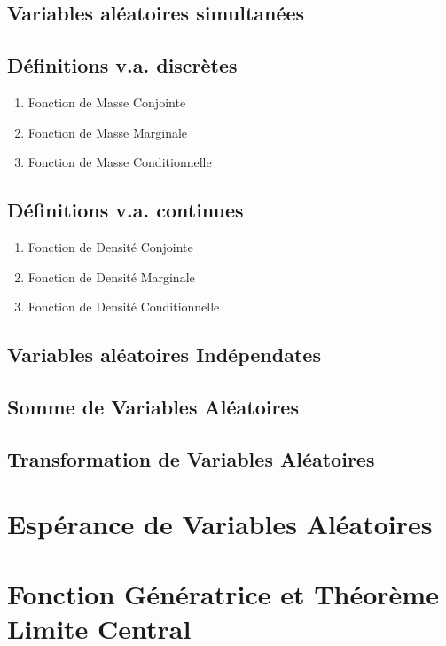 \documentclass{article}
\begin{document}
\subsection{Variables aléatoires simultanées}

\subsection{Définitions v.a. discrètes}

\begin{enumerate}
    \item Fonction de Masse Conjointe
    \item Fonction de Masse Marginale
    \item Fonction de Masse Conditionnelle
\end{enumerate}

\subsection{Définitions v.a. continues}

\begin{enumerate}
    \item Fonction de Densité Conjointe
    \item Fonction de Densité Marginale
    \item Fonction de Densité Conditionnelle
\end{enumerate}

\subsection{Variables aléatoires Indépendates}

\subsection{Somme de Variables Aléatoires}
\subsection{Transformation de Variables Aléatoires}

\section{Espérance de Variables Aléatoires}

\section{Fonction Génératrice et Théorème Limite Central}
\end{document}
